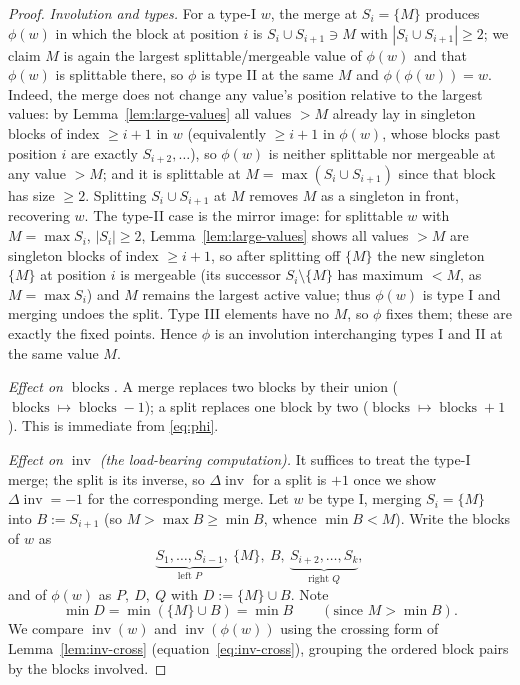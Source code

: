 \documentclass[11pt]{amsart}
\theoremstyle{definition}
\DeclareMathOperator{\inv}{inv}
\DeclareMathOperator{\blocks}{blocks}
\begin{document}
\begin{proof}
\emph{Involution and types.} For a type-I $w$, the merge at $S_i=\{M\}$ produces
$\phi(w)$ in which the block at position $i$ is $S_i\cup S_{i+1}\ni M$ with
$|S_i\cup S_{i+1}|\ge2$; we claim $M$ is again the largest splittable/mergeable
value of $\phi(w)$ and that $\phi(w)$ is splittable there, so $\phi$ is type II at
the same $M$ and $\phi(\phi(w))=w$. Indeed, the merge does not change any value's
position relative to the largest values: by Lemma~\ref{lem:large-values} all
values $>M$ already lay in singleton blocks of index $\ge i+1$ in $w$
(equivalently $\ge i+1$ in $\phi(w)$, whose blocks past position $i$ are exactly
$S_{i+2},\dots$), so $\phi(w)$ is neither splittable nor mergeable at any value
$>M$; and it is splittable at $M=\max(S_i\cup S_{i+1})$ since that block has size
$\ge2$. Splitting $S_i\cup S_{i+1}$ at $M$ removes $M$ as a singleton in front,
recovering $w$. The type-II case is the mirror image: for splittable $w$ with
$M=\max S_i$, $|S_i|\ge2$, Lemma~\ref{lem:large-values} shows all values $>M$ are
singleton blocks of index $\ge i+1$, so after splitting off $\{M\}$ the new
singleton $\{M\}$ at position $i$ is mergeable (its successor $S_i\setminus\{M\}$
has maximum $<M$, as $M=\max S_i$) and $M$ remains the largest active value; thus
$\phi(w)$ is type I and merging undoes the split. Type III elements have no $M$,
so $\phi$ fixes them; these are exactly the fixed points. Hence $\phi$ is an
involution interchanging types I and II at the same value $M$.

\emph{Effect on $\blocks$.} A merge replaces two blocks by their union
($\blocks\mapsto\blocks-1$); a split replaces one block by two
($\blocks\mapsto\blocks+1$). This is immediate from \eqref{eq:phi}.

\emph{Effect on $\inv$ (the load-bearing computation).} It suffices to treat the
type-I merge; the split is its inverse, so $\Delta\inv$ for a split is $+1$ once
we show $\Delta\inv=-1$ for the corresponding merge. Let $w$ be type I, merging
$S_i=\{M\}$ into $B:=S_{i+1}$ (so $M>\max B\ge\min B$, whence $\min B<M$). Write
the blocks of $w$ as
\[
\underbrace{S_1,\dots,S_{i-1}}_{\text{left }P},\ \{M\},\ B,\
\underbrace{S_{i+2},\dots,S_k}_{\text{right }Q},
\]
and of $\phi(w)$ as $P,\ D,\ Q$ with $D:=\{M\}\cup B$. Note
\begin{equation}\label{eq:minD}
\min D=\min(\{M\}\cup B)=\min B\qquad(\text{since }M>\min B).
\end{equation}
We compare $\inv(w)$ and $\inv(\phi(w))$ using the crossing form of Lemma~\ref{lem:inv-cross}
(equation~\eqref{eq:inv-cross}), grouping the ordered block pairs by the blocks involved.


\end{proof}
\end{document}
